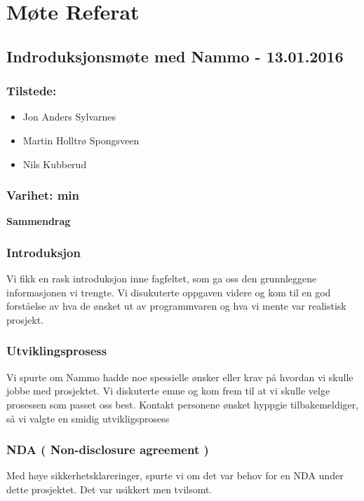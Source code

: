 \chapter{Møte Referat}

\section{Indroduksjonsmøte med Nammo - 13.01.2016}

\subsection*{Tilstede:}
\begin{multicols}{2}
\begin{itemize}
    \item Jon Anders Sylvarnes
    \item Martin Holltrø Spongsveen
    \item Nils Kubberud
\end{itemize}{}
\end{multicols}
\subsection*{\large Varihet:  min}
\textbf{\Large Sammendrag}

\subsection*{Introduksjon}
Vi fikk en rask introduksjon inne fagfeltet, som ga oss den grunnleggene informasjonen vi trengte. Vi disukuterte oppgaven videre og kom til en god forståelse av hva de ønsket ut av programmvaren og hva vi mente var realistisk prosjekt.

\subsection*{Utviklingsprosess}
Vi spurte om Nammo hadde noe spessielle ønsker eller krav på hvordan vi skulle jobbe med prosjektet. Vi diskuterte emne og kom frem til at vi skulle velge prosessen som passet oss best. Kontakt personene ønsket hyppgie tilbakemeldiger, så vi valgte en smidig utvikligsprosess

\subsection*{NDA ( Non-disclosure agreement )}
Med høye sikkerhetsklareringer, spurte vi om det var behov for en NDA under dette prosjektet. Det var usikkert men tvilsomt.

